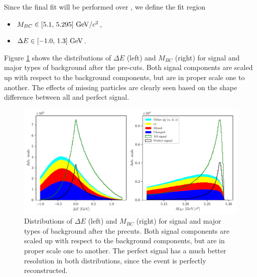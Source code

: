 Since the final fit will be performed over \vars, we define the fit region
\begin{itemize}
\item $M_{BC} \in [5.1,\,5.295]\mathrm{~GeV}/c^2$,
\item $\Delta E \in [-1.0,\,1.3]\mathrm{~GeV}$.
\end{itemize}

Figure \ref{fig:mbc_de_pre} shows the distributions of $\Delta E$ (left) and $M_{BC}$ (right) for signal and major types of background after the pre-cuts. Both signal components are scaled up with respect to the background components, but are in proper scale one to another. The effects of missing particles are clearly seen based on the shape difference between all and perfect signal.

\begin{figure}[H]
\centering
\captionsetup{width=0.8\linewidth}
\includegraphics[width=\linewidth]{fig/mbc_de_pre}
\caption{Distributions of $\Delta E$ (left) and $M_{BC}$ (right) for signal and major types of background after the precuts. Both signal components are scaled up with respect to the background components, but are in proper scale one to another. The perfect signal has a much better resolution in both distributions, since the event is perfectly reconstructed.}
\label{fig:mbc_de_pre}
\end{figure}



